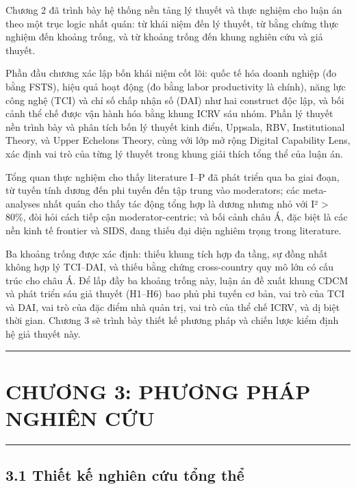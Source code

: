 \documentclass[12pt,a4paper]{article}
\begin{document}
Chương 2 đã trình bày hệ thống nền tảng lý thuyết và thực nghiệm cho
luận án theo một trục logic nhất quán: từ khái niệm đến lý thuyết, từ
bằng chứng thực nghiệm đến khoảng trống, và từ khoảng trống đến khung
nghiên cứu và giả thuyết.

Phần đầu chương xác lập bốn khái niệm cốt lõi: quốc tế hóa doanh nghiệp
(đo bằng FSTS), hiệu quả hoạt động (đo bằng labor productivity là
chính), năng lực công nghệ (TCI) và chỉ số chấp nhận số (DAI) như hai
construct độc lập, và bối cảnh thể chế được vận hành hóa bằng khung ICRV
sáu nhóm. Phần lý thuyết nền trình bày và phân tích bốn lý thuyết kinh
điển, Uppsala, RBV, Institutional Theory, và Upper Echelons Theory, cùng
với lớp mở rộng Digital Capability Lens, xác định vai trò của từng lý
thuyết trong khung giải thích tổng thể của luận án.

Tổng quan thực nghiệm cho thấy literature I--P đã phát triển qua ba giai
đoạn, từ tuyến tính dương đến phi tuyến đến tập trung vào moderators;
các meta-analyses nhất quán cho thấy tác động tổng hợp là dương nhưng
nhỏ với I² \textgreater{} 80\%, đòi hỏi cách tiếp cận moderator-centric;
và bối cảnh châu Á, đặc biệt là các nền kinh tế frontier và SIDS, đang
thiếu đại diện nghiêm trọng trong literature.

Ba khoảng trống được xác định: thiếu khung tích hợp đa tầng, sự đồng
nhất không hợp lý TCI--DAI, và thiếu bằng chứng cross-country quy mô lớn
có cấu trúc cho châu Á. Để lấp đầy ba khoảng trống này, luận án đề xuất
khung CDCM và phát triển sáu giả thuyết (H1--H6) bao phủ phi tuyến cơ
bản, vai trò của TCI và DAI, vai trò của đặc điểm nhà quản trị, vai trò
của thể chế ICRV, và dị biệt thời gian. Chương 3 sẽ trình bày thiết kế
phương pháp và chiến lược kiểm định hệ giả thuyết này.

\begin{center}\rule{0.5\linewidth}{0.5pt}\end{center}

\hypertarget{chux1b0ux1a1ng-3-phux1b0ux1a1ng-phuxe1p-nghiuxean-cux1ee9u}{%
\section{CHƯƠNG 3: PHƯƠNG PHÁP NGHIÊN
CỨU}\label{chux1b0ux1a1ng-3-phux1b0ux1a1ng-phuxe1p-nghiuxean-cux1ee9u}}

\begin{center}\rule{0.5\linewidth}{0.5pt}\end{center}

\hypertarget{31-thiux1ebft-kux1ebf-nghiuxean-cux1ee9u-tux1ed5ng-thux1ec3}{%
\subsection{3.1 Thiết kế nghiên cứu tổng
thể}\label{31-thiux1ebft-kux1ebf-nghiuxean-cux1ee9u-tux1ed5ng-thux1ec3}}
\end{document}

